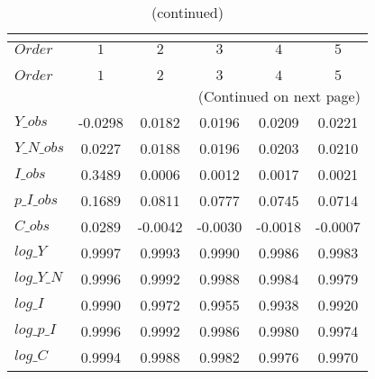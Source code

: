  
\begin{center}
\begin{longtable}{lccccc} 
\caption{COEFFICIENTS OF AUTOCORRELATION}\\
 \label{Table:th_autocorr_matrix}\\
\toprule 
$Order      $	 & 	 $          1$	 & 	 $          2$	 & 	 $          3$	 & 	 $          4$	 & 	 $          5$\\
\midrule \endfirsthead 
\caption{(continued)}\\
 \toprule \\ 
$Order      $	 & 	 $          1$	 & 	 $          2$	 & 	 $          3$	 & 	 $          4$	 & 	 $          5$\\
\midrule \endhead 
\midrule \multicolumn{6}{r}{(Continued on next page)} \\ \bottomrule \endfoot 
\bottomrule \endlastfoot 
$Y\_obs     $	 & 	    -0.0298	 & 	     0.0182	 & 	     0.0196	 & 	     0.0209	 & 	     0.0221 \\ 
$Y\_N\_obs  $	 & 	     0.0227	 & 	     0.0188	 & 	     0.0196	 & 	     0.0203	 & 	     0.0210 \\ 
$I\_obs     $	 & 	     0.3489	 & 	     0.0006	 & 	     0.0012	 & 	     0.0017	 & 	     0.0021 \\ 
$p\_I\_obs  $	 & 	     0.1689	 & 	     0.0811	 & 	     0.0777	 & 	     0.0745	 & 	     0.0714 \\ 
$C\_obs     $	 & 	     0.0289	 & 	    -0.0042	 & 	    -0.0030	 & 	    -0.0018	 & 	    -0.0007 \\ 
$log\_Y     $	 & 	     0.9997	 & 	     0.9993	 & 	     0.9990	 & 	     0.9986	 & 	     0.9983 \\ 
$log\_Y\_N  $	 & 	     0.9996	 & 	     0.9992	 & 	     0.9988	 & 	     0.9984	 & 	     0.9979 \\ 
$log\_I     $	 & 	     0.9990	 & 	     0.9972	 & 	     0.9955	 & 	     0.9938	 & 	     0.9920 \\ 
$log\_p\_I  $	 & 	     0.9996	 & 	     0.9992	 & 	     0.9986	 & 	     0.9980	 & 	     0.9974 \\ 
$log\_C     $	 & 	     0.9994	 & 	     0.9988	 & 	     0.9982	 & 	     0.9976	 & 	     0.9970 \\ 
\end{longtable}
 \end{center}
